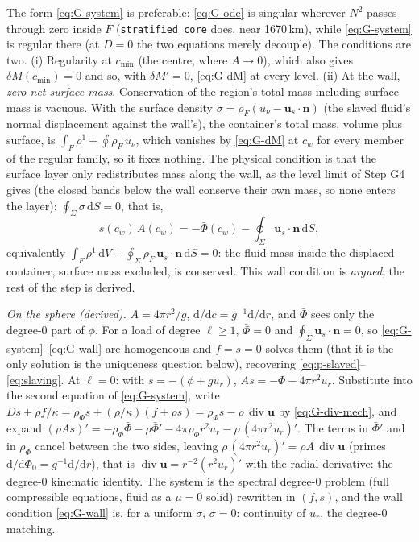 \documentclass[11pt]{article}
\newcommand{\bu}{\mathbf{u}}
\newcommand{\bn}{\mathbf{n}}
\newcommand{\dS}{\,\mathrm{d}S}
\newcommand{\dV}{\,\mathrm{d}V}
\newcommand{\Div}{\operatorname{div}}
\newcommand{\code}[1]{\texttt{#1}}
\begin{document}
The form \eqref{eq:G-system} is preferable: \eqref{eq:G-ode} is singular
wherever $N^2$ passes through zero inside $F$ (\code{stratified\_core}
does, near 1670\,km), while \eqref{eq:G-system} is regular there (at
$D = 0$ the two equations merely decouple). The conditions are two.
(i) Regularity at $c_{\min}$ (the centre, where $A \to 0$), which also
gives $\delta M(c_{\min}) = 0$ and so, with $\delta M' = 0$,
\eqref{eq:G-dM} at every level. (ii) At the wall, \emph{zero net
surface mass}. Conservation of the region's total
mass including surface mass is vacuous. With the surface density
$\sigma = \rho_F(u_\nu - \bu_s\cdot\bn)$ (the slaved fluid's normal
displacement against the wall's), the container's total mass, volume
plus surface, is $\int_F\rho^1 + \oint\rho_F\,u_\nu$, which vanishes by
\eqref{eq:G-dM} at $c_w$ for every member of the regular family, so it
fixes nothing. The physical condition is
that the surface layer only redistributes mass along the wall, as the
level limit of Step G4 gives (the closed bands below the wall conserve
their own mass, so none enters the layer): $\oint_\Sigma\sigma\dS = 0$,
that is,
\begin{equation}
  s(c_w)\,A(c_w) = -\bar\Phi(c_w) - \oint_\Sigma \bu_s\cdot\bn\dS ,
  \label{eq:G-wall}
\end{equation}
equivalently $\int_F\rho^1\dV + \oint_\Sigma\rho_F\,\bu_s\cdot\bn\dS = 0$:
the fluid mass inside the displaced container, surface mass excluded,
is conserved. This wall condition is \emph{argued}; the rest of the
step is derived.

\emph{On the sphere (derived).} $A = 4\pi r^2/g$,
$\mathrm d/\mathrm dc = g^{-1}\mathrm d/\mathrm dr$, and $\bar\Phi$
sees only the degree-0 part of $\phi$. For a load of degree
$\ell \ge 1$, $\bar\Phi = 0$ and $\oint_\Sigma\bu_s\cdot\bn = 0$, so
\eqref{eq:G-system}--\eqref{eq:G-wall} are homogeneous and $f = s = 0$
solves them (that it is the only solution is the uniqueness question
below), recovering \eqref{eq:p-slaved}--\eqref{eq:slaving}. At
$\ell = 0$: with $s = -(\phi + g u_r)$, $A s = -\bar\Phi - 4\pi r^2 u_r$.
Substitute into the second equation of \eqref{eq:G-system}, write
$D s + \rho f/\kappa = \rho_\Phi s + (\rho/\kappa)(f + \rho s)
= \rho_\Phi s - \rho\,\Div\bu$ by \eqref{eq:G-div-mech}, and expand
$(\rho A s)' = -\rho_\Phi\bar\Phi - \rho\bar\Phi' - 4\pi\rho_\Phi r^2 u_r
- \rho\,(4\pi r^2 u_r)'$. The terms in $\bar\Phi'$ and in $\rho_\Phi$
cancel between the two sides, leaving
$\rho\,(4\pi r^2 u_r)' = \rho A\,\Div\bu$ (primes $\mathrm d/\mathrm d\Phi_0
= g^{-1}\mathrm d/\mathrm dr$), that is $\Div\bu = r^{-2}(r^2 u_r)'$ with
the radial derivative: the degree-0 kinematic identity. The system is the spectral degree-0
problem (full compressible equations, fluid as a $\mu = 0$ solid)
rewritten in $(f, s)$, and the wall condition \eqref{eq:G-wall} is, for
a uniform $\sigma$, $\sigma = 0$: continuity of $u_r$, the degree-0
matching.
\end{document}
